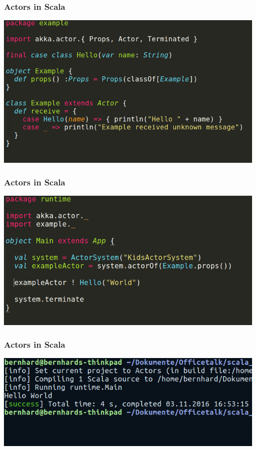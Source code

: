 \documentclass{beamer}
\begin{document}
\begin{frame}
\frametitle{Actors in Scala}
\includegraphics[width=1\linewidth]{./images/scala_example_actor.png}
\end{frame}


\begin{frame}
\frametitle{Actors in Scala}
\includegraphics[width=1\linewidth]{./images/scala_example_main.png}
\end{frame}


\begin{frame}
\frametitle{Actors in Scala}
\includegraphics[width=1\linewidth]{./images/scala_example_terminal.png}
\end{frame}
\end{document}
